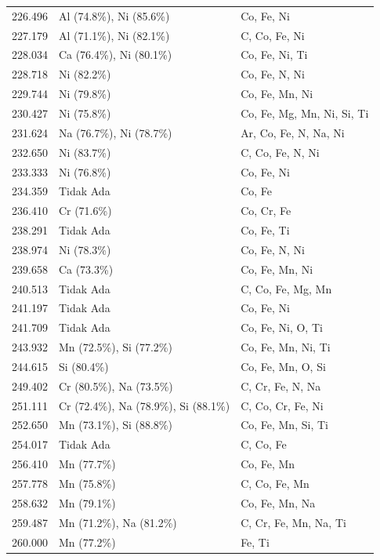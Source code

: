 \begin{onehalfspace}
\begin{longtable}{p{}p{}p{}}
        226.496 & Al (74.8\%), Ni (85.6\%) & Co, Fe, Ni \\
        227.179 & Al (71.1\%), Ni (82.1\%) & C, Co, Fe, Ni \\
        228.034 & Ca (76.4\%), Ni (80.1\%) & Co, Fe, Ni, Ti \\
        228.718 & Ni (82.2\%) & Co, Fe, N, Ni \\
        229.744 & Ni (79.8\%) & Co, Fe, Mn, Ni \\
        230.427 & Ni (75.8\%) & Co, Fe, Mg, Mn, Ni, Si, Ti \\
        231.624 & Na (76.7\%), Ni (78.7\%) & Ar, Co, Fe, N, Na, Ni \\
        232.650 & Ni (83.7\%) & C, Co, Fe, N, Ni \\
        233.333 & Ni (76.8\%) & Co, Fe, Ni \\
        234.359 & Tidak Ada & Co, Fe \\
        236.410 & Cr (71.6\%) & Co, Cr, Fe \\
        238.291 & Tidak Ada & Co, Fe, Ti \\
        238.974 & Ni (78.3\%) & Co, Fe, N, Ni \\
        239.658 & Ca (73.3\%) & Co, Fe, Mn, Ni \\
        240.513 & Tidak Ada & C, Co, Fe, Mg, Mn \\
        241.197 & Tidak Ada & Co, Fe, Ni \\
        241.709 & Tidak Ada & Co, Fe, Ni, O, Ti \\
        243.932 & Mn (72.5\%), Si (77.2\%) & Co, Fe, Mn, Ni, Ti \\
        244.615 & Si (80.4\%) & Co, Fe, Mn, O, Si \\
        249.402 & Cr (80.5\%), Na (73.5\%) & C, Cr, Fe, N, Na \\
        251.111 & Cr (72.4\%), Na (78.9\%), Si (88.1\%) & C, Co, Cr, Fe, Ni \\
        252.650 & Mn (73.1\%), Si (88.8\%) & Co, Fe, Mn, Si, Ti \\
        254.017 & Tidak Ada & C, Co, Fe \\
        256.410 & Mn (77.7\%) & Co, Fe, Mn \\
        257.778 & Mn (75.8\%) & C, Co, Fe, Mn \\
        258.632 & Mn (79.1\%) & Co, Fe, Mn, Na \\
        259.487 & Mn (71.2\%), Na (81.2\%) & C, Cr, Fe, Mn, Na, Ti \\
        260.000 & Mn (77.2\%) & Fe, Ti \\

\end{longtable}
\end{onehalfspace}
